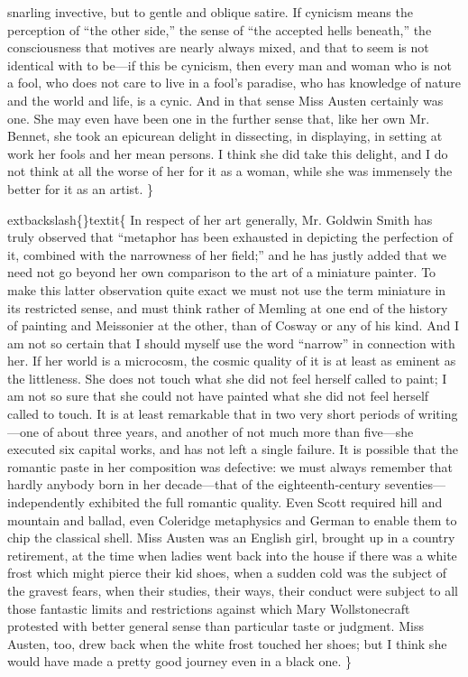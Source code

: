 \documentclass[10pt]{book}
\begin{document}
snarling invective, but to gentle and oblique satire. If cynicism means
the perception of “the other side,” the sense of “the accepted hells
beneath,” the consciousness that motives are nearly always mixed, and
that to seem is not identical with to be—if this be cynicism, then
every man and woman who is not a fool, who does not care to live in a
fool’s paradise, who has knowledge of nature and the world and life, is
a cynic. And in that sense Miss Austen certainly was one. She may even
have been one in the further sense that, like her own Mr. Bennet, she
took an epicurean delight in dissecting, in displaying, in setting at
work her fools and her mean persons. I think she did take this delight,
and I do not think at all the worse of her for it as a woman, while she
was immensely the better for it as an artist.
   \}

	extbackslash\{\}textit\{
    In respect of her art generally, Mr. Goldwin Smith has truly observed
that “metaphor has been exhausted in depicting the perfection of it,
combined with the narrowness of her field;” and he has justly added that
we need not go beyond her own comparison to the art of a miniature
    painter. To make this latter observation quite exact we must not use the
term miniature in its restricted sense, and must think rather of Memling
at one end of the history of painting and Meissonier at the other, than
of Cosway or any of his kind. And I am not so certain that I should
myself use the word “narrow” in connection with her. If her world is a
microcosm, the cosmic quality of it is at least as eminent as the
littleness. She does not touch what she did not feel herself called to
paint; I am not so sure that she could not have painted what she did not
feel herself called to touch. It is at least remarkable that in two very
short periods of writing—one of about three years, and another of not
much more than five—she executed six capital works, and has not left a
single failure. It is possible that the romantic paste in her
composition was defective: we must always remember that hardly anybody
born in her decade—that of the eighteenth-century
seventies—independently exhibited the full romantic quality. Even Scott
required hill and mountain and ballad, even Coleridge metaphysics and
German to enable them to chip the classical shell. Miss Austen was an
English girl, brought up in a country retirement, at the time when
ladies went back into the house if there was a white frost which might
pierce their kid shoes, when a sudden cold was the subject of the
gravest fears, when their studies, their ways, their conduct were
subject to all those fantastic limits and restrictions against which
Mary Wollstonecraft protested with better general sense than particular
taste or judgment. Miss Austen, too, drew back when the white frost
touched her shoes; but I think she would have made a pretty good journey
even in a black one.
   \}
\end{document}

